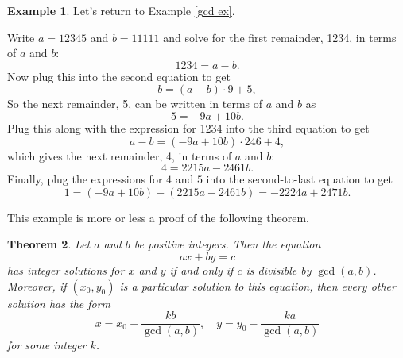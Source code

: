 \documentclass[12pt]{article}
\theoremstyle{plain}
\newtheorem{theorem}{Theorem}[section]
\theoremstyle{definition}
\newtheorem{example}[theorem]{Example}
\theoremstyle{remark}
\begin{document}
\begin{example}
    Let's return to Example \ref{gcd ex}.


    Write $a = 12345$ and $b = 11111$ and solve for the first remainder, 1234, in terms of $a$ and $b$:
    \[
        1234 = a - b.
    \]
    Now plug this into the second equation to get
    \[
        b = (a-b)\cdot 9 + 5,
    \]
    So the next remainder, 5, can be written in terms of $a$ and $b$ as
    \[
        5 = -9a + 10b.
    \]
    Plug this along with the expression for 1234 into the third equation to get
    \[
        a-b = (-9a + 10b)\cdot 246 + 4,
    \]
    which gives the next remainder, 4, in terms of $a$ and $b$:
    \[
        4 = 2215a - 2461b.
    \]
    Finally, plug the expressions for $4$ and $5$ into the second-to-last equation to get
    \[
        1 = (-9a + 10b) - (2215a - 2461b) = -2224a + 2471b.
    \]
\end{example}

This example is more or less a proof of the following theorem.

\begin{theorem}\label{bezout}
    Let $a$ and $b$ be positive integers.
    Then the equation
    \[
        ax + by = c
    \]
    has integer solutions for $x$ and $y$ if and only if $c$ is divisible by $\gcd(a,b)$.
    Moreover, if $(x_0, y_0)$ is a particular solution to this equation, then every other solution has the form
    \[
        x = x_0 + \frac{kb}{\gcd(a,b)},\quad y = y_0 - \frac{ka}{\gcd(a,b)}
    \]
    for some integer $k$.
\end{theorem}
\end{document}
